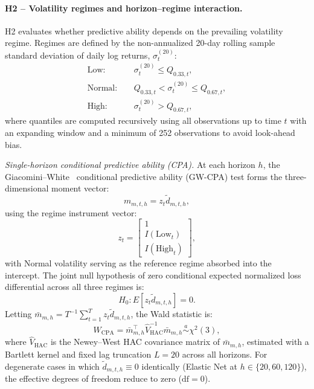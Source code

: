 \documentclass[12pt,twoside]{ord}
\begin{document}
\paragraph{H2 -- Volatility regimes and horizon--regime interaction.} H2 evaluates whether predictive ability depends on the prevailing volatility regime. Regimes are defined by the non-annualized 20-day rolling sample standard deviation of daily log returns, $\sigma_t^{(20)}$:
\[
\begin{aligned}
\mathrm{Low}:&\quad \sigma_t^{(20)}\leq Q_{0.33,t},\\
\mathrm{Normal}:&\quad Q_{0.33,t}<\sigma_t^{(20)}\leq Q_{0.67,t},\\
\mathrm{High}:&\quad \sigma_t^{(20)}>Q_{0.67,t},
\end{aligned}
\]
where quantiles are computed recursively using all observations up to time $t$ with an expanding window and a minimum of 252 observations to avoid look-ahead bias.

\textit{Single-horizon conditional predictive ability (CPA).} At each horizon $h$, the Giacomini--White~\cite{giacomini2006} conditional predictive ability (GW-CPA) test forms the three-dimensional moment vector:
\[
m_{m,t,h}=z_t\widetilde d_{m,t,h},
\]
using the regime instrument vector:
\begin{equation}
z_t=
\begin{bmatrix}
1\\
I(\mathrm{Low}_t)\\
I(\mathrm{High}_t)
\end{bmatrix},
\end{equation}
with Normal volatility serving as the reference regime absorbed into the intercept. The joint null hypothesis of zero conditional expected normalized loss differential across all three regimes is:
\begin{equation}
H_0:E[z_t\widetilde d_{m,t,h}]=0.
\end{equation}
Letting $\bar m_{m,h}=T^{-1}\sum_{t=1}^{T}z_t\widetilde d_{m,t,h}$, the Wald statistic is:
\begin{equation}
W_{\mathrm{CPA}}
=
\bar m_{m,h}^{\top}
\widehat V_{\mathrm{HAC}}^{-1}
\bar m_{m,h}
\overset{a}{\sim}\chi^2(3),
\end{equation}
where $\widehat V_{\mathrm{HAC}}$ is the Newey--West HAC covariance matrix of $\bar m_{m,h}$, estimated with a Bartlett kernel and fixed lag truncation $L=20$ across all horizons. For degenerate cases in which $\widetilde d_{m,t,h}\equiv0$ identically (Elastic Net at $h\in\{20,60,120\}$), the effective degrees of freedom reduce to zero ($\mathrm{df}=0$).
\end{document}
